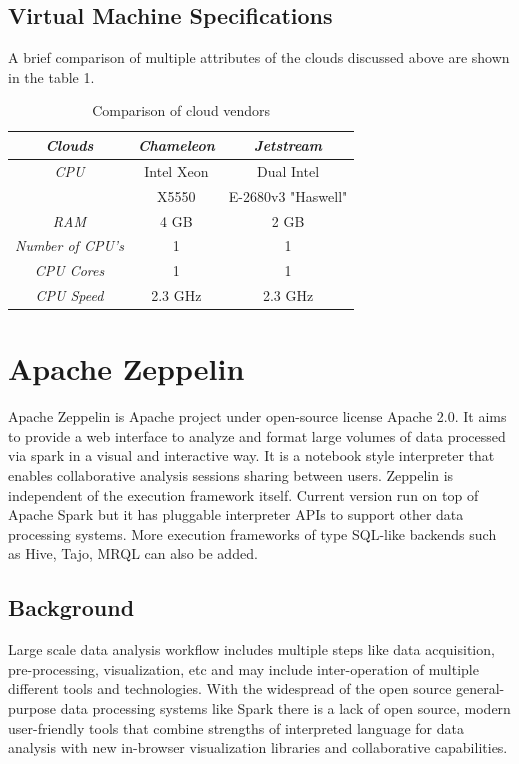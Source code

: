 \documentclass[9pt,twocolumn,twoside]{../../styles/osajnl}
\begin{document}
	\subsection{Virtual Machine Specifications}
	
	A brief comparison of multiple attributes of the clouds discussed 
	above are shown in the table 1.
	
	\begin{table}[h!]
		\centering
		\begin{tabular}{|c|c c|} 
			\hline
			\textit{Clouds} & \textit{Chameleon} & 
			\textit{Jetstream}   \\ 
			\hline
			\hline 
			\textit{CPU} & Intel Xeon & Dual Intel   \\ 
			& X5550 & E-2680v3 "Haswell"\\
			\hline 
			\textit{RAM} & 4 GB & 2 GB \\ 
			\hline 
			\textit{Number of CPU's} & 1 & 1 \\
			\hline 
			\textit{CPU Cores} & 1 & 1 \\
			\hline 
			\textit{CPU Speed} & 2.3 GHz & 2.3 GHz\\
			\hline 
		\end{tabular}
		\caption{Comparison of cloud vendors}
		\label{table:clouds}
	\end{table}
	
	
	
	\section{Apache Zeppelin}
	
	Apache Zeppelin is Apache project under open-source license 
	Apache 2.0. 
	It aims to provide a web interface to analyze and format large 
	volumes of data processed via spark in a visual and interactive 
	way. 
	It is a notebook style interpreter that enables collaborative 
	analysis sessions sharing between users. Zeppelin is independent 
	of 
	the execution framework itself. Current version run on top of 
	Apache 
	Spark but it has pluggable interpreter APIs to support other data 
	processing systems. More execution frameworks of type SQL-like 
	backends  such as Hive, Tajo, MRQL can also be added.
	
	\subsection{Background}
	
	Large scale data analysis workflow includes multiple steps like 
	data 
	acquisition, pre-processing, visualization, etc and may include 
	inter-operation of multiple different tools and technologies. 
	With 
	the widespread of the open source general-purpose data processing 
	systems like Spark there is a lack of open source, modern 
	user-friendly tools that combine strengths of interpreted 
	language 
	for data analysis with new in-browser visualization libraries and 
	collaborative capabilities.
	
\end{document}
